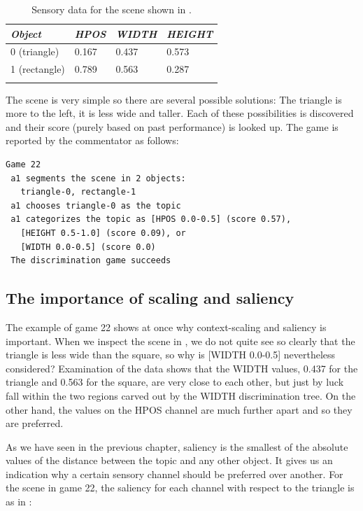 \begin{table}
\begin{center}
\begin{tabular}{ l  l  l  l }
\lsptoprule
{\itshape Object} & {\itshape HPOS} & {\itshape WIDTH} & {\itshape HEIGHT} \\ \midrule
0 (triangle) & 0.167 & 0.437 & 0.573  \\ 
1 (rectangle) & 0.789 & 0.563 & 0.287 \\  
\lspbottomrule
\end{tabular}
\caption{\label{tab:t-game22} Sensory data for the scene shown in .}
\end{center}
\end{table}

The scene is very simple so there are several possible
solutions: The triangle is more to the left, it is less wide 
and taller. Each of these possibilities is discovered
and their score (purely based on past performance) is 
looked up. The game is reported by the commentator
as follows: 
\begin{verbatim}
Game 22
 a1 segments the scene in 2 objects:  
   triangle-0, rectangle-1
 a1 chooses triangle-0 as the topic 
 a1 categorizes the topic as [HPOS 0.0-0.5] (score 0.57), 
   [HEIGHT 0.5-1.0] (score 0.09), or 
   [WIDTH 0.0-0.5] (score 0.0) 
 The discrimination game succeeds
\end{verbatim}

\subsection{The importance of scaling and saliency}

The example of game 22 shows at once why context-scaling 
and saliency is important. When we inspect the scene in 
, we do not quite see so clearly 
that the triangle is less wide than the square, so why
is [WIDTH 0.0-0.5] 
nevertheless considered? Examination of the data shows
that the WIDTH values, 0.437 for the triangle
and 0.563 for the square, are very close 
to each other, but just by luck fall within 
the two regions carved out by the WIDTH discrimination
tree. On the other hand, the values on the HPOS channel 
are much further apart and so they are preferred. 

As we have seen in the previous chapter, 
saliency is the smallest of the absolute values     
of the distance between the topic and any
other object. It gives us an indication why 
a certain sensory channel should be preferred
over another. For the scene in game 22, the saliency for each channel with 
respect to the triangle is as in : 

